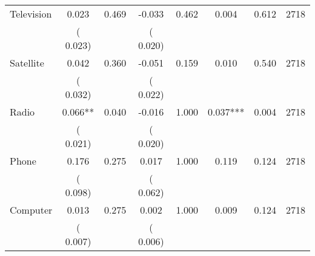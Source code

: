 \begin{tabular}{l*{7}{c}}
 Television       &              0.023       &        0.469  &             -0.033       &        0.462  &              0.004       &              0.612 &  2718 \\ 
                       &       (       0.023)             &                               &       (       0.020)                     &                               &                                               &                                &                      \\ 

 Satellite       &              0.042       &        0.360  &             -0.051       &        0.159  &              0.010       &              0.540 &  2718 \\ 
                       &       (       0.032)             &                               &       (       0.022)                     &                               &                                               &                                &                      \\ 

 Radio       &              0.066**       &        0.040  &             -0.016       &        1.000  &              0.037***       &              0.004 &  2718 \\ 
                       &       (       0.021)             &                               &       (       0.020)                     &                               &                                               &                                &                      \\ 

 Phone       &              0.176       &        0.275  &              0.017       &        1.000  &              0.119       &              0.124 &  2718 \\ 
                       &       (       0.098)             &                               &       (       0.062)                     &                               &                                               &                                &                      \\ 

 Computer       &              0.013       &        0.275  &              0.002       &        1.000  &              0.009       &              0.124 &  2718 \\ 
                       &       (       0.007)             &                               &       (       0.006)                     &                               &                                               &                                &                      \\ 


\end{tabular}
